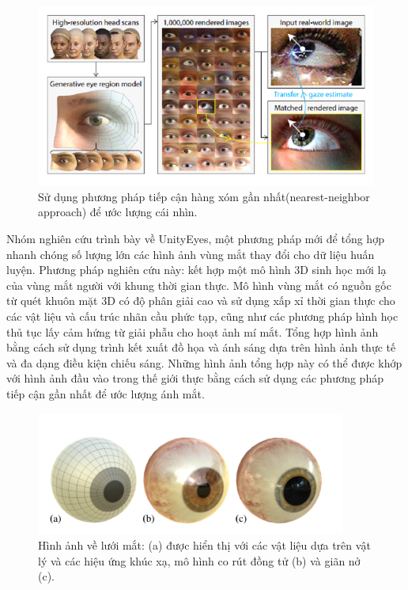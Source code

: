 \begin{center}
    \begin{figure}[h!]
    \begin{center}
     \includegraphics[scale=0.70]{img/Image_dataset_the_nearest_neighbor_approach.png}
    \end{center}
    \caption{Sử dụng phương pháp tiếp cận hàng xóm gần nhất(nearest-neighbor approach) để ước lượng cái nhìn.}
    \label{refhinh15}
    \end{figure}
\end{center}

Nhóm nghiên cứu trình bày về UnityEyes, một phương pháp mới để tổng hợp nhanh chóng số lượng lớn các hình ảnh vùng mắt thay đổi cho dữ liệu huấn luyện. Phương pháp nghiên cứu này: kết hợp một mô hình 3D sinh học mới lạ của vùng mắt người với khung thời gian thực. Mô hình vùng mắt có nguồn gốc từ quét khuôn mặt 3D có độ phân giải cao và sử dụng xấp xỉ thời gian thực cho các vật liệu và cấu trúc nhãn cầu phức tạp, cũng như các phương pháp hình học thủ tục lấy cảm hứng từ giải phẫu cho hoạt ảnh mí mắt. Tổng hợp hình ảnh bằng cách sử dụng trình kết xuất đồ họa và ánh sáng dựa trên hình ảnh thực tế và đa dạng điều kiện chiếu sáng. Những hình ảnh tổng hợp này có thể được khớp với hình ảnh đầu vào trong thế giới thực bằng cách sử dụng các phương pháp tiếp cận gần nhất để ước lượng ánh mắt. 

\begin{center}
    \begin{figure}[h!]
    \begin{center}
     \includegraphics[scale=1]{img/Eyeball_mesh.png}
    \end{center}
    \caption{Hình ảnh về lưới mắt: (a) được hiển thị với các vật liệu dựa trên vật lý và các hiệu ứng khúc xạ, mô hình co rút đồng tử (b) và giãn nở (c).}
    \label{refhinh15}
    \end{figure}
\end{center}

